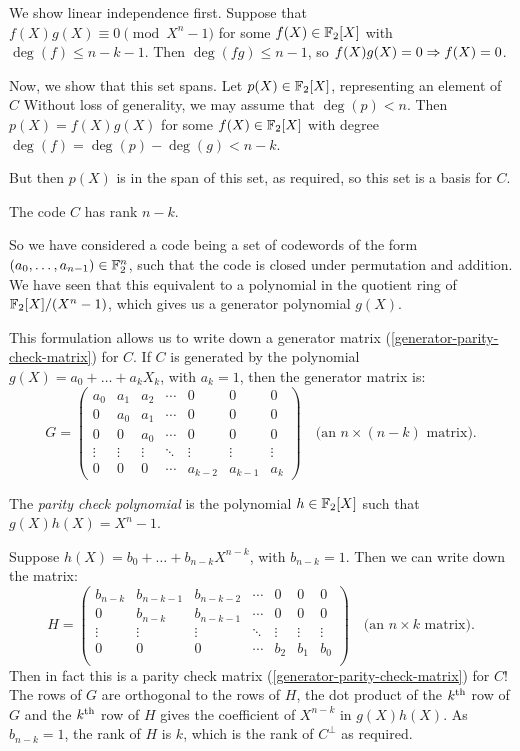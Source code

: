 \documentclass{article}
\begin{document}
\begin{prf}
    We show linear independence first. Suppose that $f(X)g(X) \equiv 0 \pmod{X^n-1}$ for some $f(X) \in \mathbb{F}_2[X]$ with $\deg(f) \leq n - k - 1$. Then $\deg(fg) \leq n-1$, so $f(X)g(X) = 0 \Rightarrow f(X)=0$.
    
    Now, we show that this set spans. Let $p(X) \in \mathbb{F}_2[X]$, representing an element of $C$ Without loss of generality, we may assume that $\deg(p) < n$. Then $p(X) = f(X)g(X)$ for some $f(X) \in \mathbb{F}_2[X]$ with degree $\deg(f) = \deg(p) - \deg(g) < n - k$.
    
    But then $p(X)$ is in the span of this set, as required, so this set is a basis for $C$.
\end{prf}

\begin{corollary}
    The code $C$ has rank $n - k$.
\end{corollary}

So we have considered a code being a set of codewords of the form $(a_0, \dots, a_{n-1}) \in \mathbb{F}_2^n$, such that the code is closed under permutation and addition. We have seen that this equivalent to a polynomial in the quotient ring of $\mathbb{F}_2[X] / (X^n-1)$, which gives us a generator polynomial $g(X)$.

This formulation allows us to write down a generator matrix (\ref{generator-parity-check-matrix}) for $C$. If $C$ is generated by the polynomial $g(X) = a_0 + \dots + a_k X_k$, with $a_k = 1$, then the generator matrix is:
\[
G = \begin{pmatrix}
	a_0 & a_1 & a_2 & \cdots & 0 & 0 & 0 \\
	0 & a_0 & a_1 & \cdots & 0 & 0 & 0 \\
	0 & 0 & a_0 & \cdots & 0 & 0 & 0 \\
	\vdots & \vdots & \vdots & \ddots & \vdots & \vdots & \vdots \\
	0 & 0 & 0 & \cdots & a_{k-2} & a_{k-1} & a_k
\end{pmatrix}
\quad
\text{(an $n \times (n-k)$ matrix).}
\]
\begin{definition}
    The \textit{parity check polynomial} is the polynomial $h \in \mathbb{F}_2[X]$ such that $g(X)h(X) = X^n-1$.
\end{definition}

Suppose $h(X) = b_0 + \dots + b_{n-k}X^{n-k}$, with $b_{n-k} = 1$. Then we can write down the matrix:
\[
H = \begin{pmatrix}
	b_{n-k} & b_{n-k-1} & b_{n-k-2} & \cdots & 0 & 0 & 0 \\
	0 & b_{n-k} & b_{n-k-1} & \cdots & 0 & 0 & 0 \\
	\vdots & \vdots & \vdots & \ddots & \vdots & \vdots & \vdots \\
	0 & 0 & 0 & \cdots & b_2 & b_1 & b_0 \\
\end{pmatrix}
\quad
\text{(an $n \times k$ matrix).}
\]
Then in fact this is a parity check matrix (\ref{generator-parity-check-matrix}) for $C$! The rows of $G$ are orthogonal to the rows of $H$, the dot product of the $k^{\text{th}}$ row of $G$ and the $k^{\text{th}}$ row of $H$ gives the coefficient of $X^{n-k}$ in $g(X)h(X)$. As $b_{n-k} = 1$, the rank of $H$ is $k$, which is the rank of $C^\bot$ as required.
\end{document}
